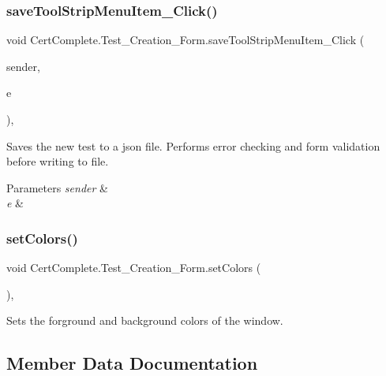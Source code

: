 \subsubsection{\texorpdfstring{save\+Tool\+Strip\+Menu\+Item\+\_\+\+Click()}{saveToolStripMenuItem\_Click()}}
{\footnotesize\ttfamily void Cert\+Complete.\+Test\+\_\+\+Creation\+\_\+\+Form.\+save\+Tool\+Strip\+Menu\+Item\+\_\+\+Click (\begin{DoxyParamCaption}\item[{object}]{sender,  }\item[{Event\+Args}]{e }\end{DoxyParamCaption})\hspace{0.3cm}{\ttfamily [inline]}, {\ttfamily [private]}}



Saves the new test to a json file. Performs error checking and form validation before writing to file. 


\begin{DoxyParams}{Parameters}
{\em sender} & \\
\hline
{\em e} & \\
\hline
\end{DoxyParams}
\mbox{\label{class_cert_complete_1_1_test___creation___form_a802231fb90fb9973dce0e5040087e317}} 
\subsubsection{\texorpdfstring{set\+Colors()}{setColors()}}
{\footnotesize\ttfamily void Cert\+Complete.\+Test\+\_\+\+Creation\+\_\+\+Form.\+set\+Colors (\begin{DoxyParamCaption}{ }\end{DoxyParamCaption})\hspace{0.3cm}{\ttfamily [inline]}, {\ttfamily [private]}}



Sets the forground and background colors of the window. 



\subsection{Member Data Documentation}
\mbox{\label{class_cert_complete_1_1_test___creation___form_ac77fc5bb546eb56f8e804234b71f61d7}} 
